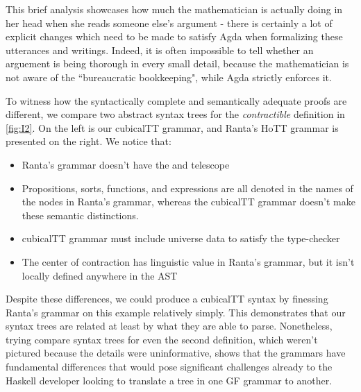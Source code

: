 This brief analysis showcases how much the mathematician is actually doing in
her head when she reads someone else's argument - there is certainly a lot of
explicit changes which need to be made to satisfy Agda when formalizing these
utterances and writings. Indeed, it is often impossible to tell whether an
arguement is being thorough in every small detail, because the mathematician is
not aware of the ``bureaucratic bookkeeping", while Agda strictly enforces it.

To witness how the syntactically complete and semantically adequate proofs are
different, we compare two abstract syntax trees for the \emph{contractible}
definition in \autoref{fig:I2}. On the left is our cubicalTT grammar, and
Ranta's HoTT grammar is presented on the right. We notice that:

\begin{itemize}

\item Ranta's grammar doesn't have the  and  telescope

\item Propositions, sorts, functions, and expressions are all denoted in the
names of the nodes in Ranta's grammar, whereas the cubicalTT grammar doesn't
make these semantic distinctions.

\item cubicalTT grammar must include universe data to satisfy the type-checker

\item The center of contraction has linguistic value in Ranta's grammar, but it
isn't locally defined anywhere in the AST

\end{itemize}

Despite these differences, we could produce a cubicalTT syntax by finessing
Ranta's grammar on this example relatively simply. This demonstrates that our
syntax trees are related at least by what they are able to parse. Nonetheless,
trying compare syntax trees for even the second definition, which weren't
pictured because the details were uninformative, shows that the grammars have
fundamental differences that would pose significant challenges already to the
Haskell developer looking to translate a tree in one GF grammar to another.

